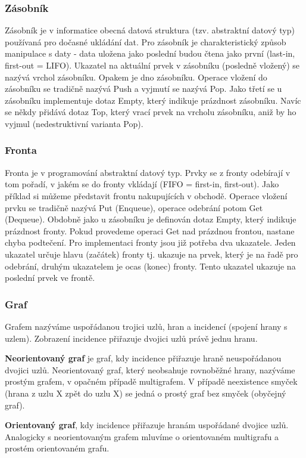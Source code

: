 \subsubsection{Zásobník}
Zásobník je v informatice obecná datová struktura (tzv. abstraktní datový typ) používaná pro dočasné ukládání dat. Pro zásobník je charakteristický způsob manipulace s daty - data uložena jako poslední budou čtena jako první (last-in, first-out = LIFO).
Ukazatel na aktuální prvek v zásobníku (posledně vložený) se nazývá vrchol zásobníku. Opakem je dno zásobníku. Operace vložení do zásobníku se tradičně nazývá Push a vyjmutí se nazývá Pop. Jako třetí se u zásobníku implementuje dotaz Empty, který indikuje prázdnost zásobníku. Navíc se někdy přidává dotaz Top, který vrací prvek na vrcholu zásobníku, aniž by ho vyjmul (nedestruktivní varianta Pop).

\subsubsection{Fronta}
Fronta je v programování abstraktní datový typ. Prvky se z fronty odebírají v tom pořadí, v jakém se do fronty vkládají (FIFO = first-in, first-out). Jako příklad si můžeme představit frontu nakupujících v obchodě. Operace vložení prvku se tradičně nazývá Put (Enqueue), operace odebrání potom Get (Dequeue). Obdobně jako u zásobníku je definován dotaz Empty, který indikuje prázdnost fronty. Pokud provedeme operaci Get nad prázdnou frontou, nastane chyba podtečení. Pro implementaci fronty jsou již potřeba dva ukazatele. Jeden ukazatel určuje hlavu (začátek) fronty tj. ukazuje na prvek, který je na řadě pro odebrání, druhým ukazatelem je ocas (konec) fronty. Tento ukazatel ukazuje na poslední prvek ve frontě.

\subsubsection{Graf}
Grafem nazýváme uspořádanou trojici uzlů, hran a incidencí (spojení hrany s uzlem). Zobrazení incidence přiřazuje dvojici uzlů právě jednu hranu.

\textbf{Neorientovaný graf} je graf, kdy incidence přiřazuje hraně neuspořádanou dvojici uzlů. Neorientovaný graf, který neobsahuje rovnoběžné hrany, nazýváme prostým grafem, v opačném případě multigrafem. V případě neexistence smyček (hrana z uzlu X zpět do uzlu X) se jedná o prostý graf bez smyček (obyčejný graf).

\textbf{Orientovaný graf}, kdy incidence přiřazuje hranám uspořádané dvojice uzlů. Analogicky s neorientovaným grafem mluvíme o orientovaném multigrafu a prostém orientovaném grafu. 

